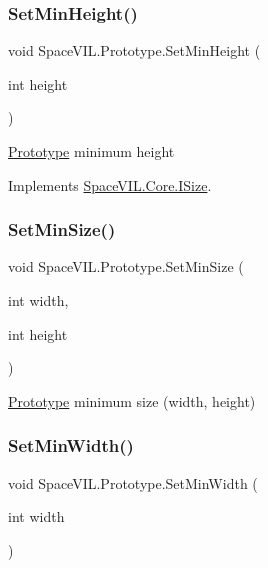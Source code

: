 \subsubsection{\texorpdfstring{Set\+Min\+Height()}{SetMinHeight()}}
{\footnotesize\ttfamily void Space\+V\+I\+L.\+Prototype.\+Set\+Min\+Height (\begin{DoxyParamCaption}\item[{int}]{height }\end{DoxyParamCaption})\hspace{0.3cm}{\ttfamily [inline]}}



\mbox{\hyperlink{class_space_v_i_l_1_1_prototype}{Prototype}} minimum height 



Implements \mbox{\hyperlink{interface_space_v_i_l_1_1_core_1_1_i_size}{Space\+V\+I\+L.\+Core.\+I\+Size}}.

\mbox{\label{class_space_v_i_l_1_1_prototype_a799cc25e25e57ca5b89d488a38cd8063}} 
\subsubsection{\texorpdfstring{Set\+Min\+Size()}{SetMinSize()}}
{\footnotesize\ttfamily void Space\+V\+I\+L.\+Prototype.\+Set\+Min\+Size (\begin{DoxyParamCaption}\item[{int}]{width,  }\item[{int}]{height }\end{DoxyParamCaption})\hspace{0.3cm}{\ttfamily [inline]}}



\mbox{\hyperlink{class_space_v_i_l_1_1_prototype}{Prototype}} minimum size (width, height) 

\mbox{\label{class_space_v_i_l_1_1_prototype_a9594f8484683ec450e8ce20b0c5fad1c}} 
\subsubsection{\texorpdfstring{Set\+Min\+Width()}{SetMinWidth()}}
{\footnotesize\ttfamily void Space\+V\+I\+L.\+Prototype.\+Set\+Min\+Width (\begin{DoxyParamCaption}\item[{int}]{width }\end{DoxyParamCaption})\hspace{0.3cm}{\ttfamily [inline]}}




